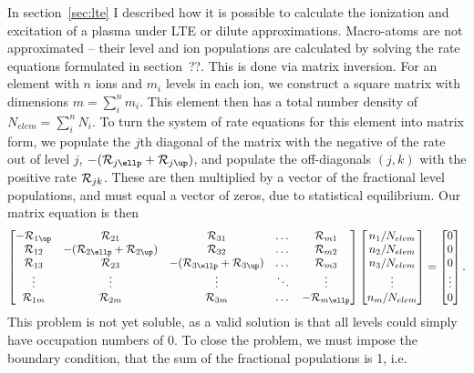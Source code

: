In section~\ref{sec:lte} I described how it is possible to calculate the
ionization and excitation of a plasma under LTE or dilute approximations.
Macro-atoms are not approximated -- their level and ion populations are 
calculated by solving the rate equations formulated in section~??. 
This is done via matrix inversion. For an element with $n$ ions and $m_i$
levels in each ion, we construct a square matrix with dimensions 
$m = \sum_i^n m_i$.
This element then has a total number density of $N_{elem} = \sum_i^n N_i$.
To turn the system of rate equations for this element into matrix form, we
populate the $j$th diagonal of the matrix with the negative of the rate out of
level $j$, $-({\cal R}_{j\ellp} + {\cal R}_{j\up})$, 
and populate the off-diagonals $(j,k)$ with the positive rate 
${\cal R}_{jk}$. These are then multiplied by a vector of the fractional level
populations, and must equal a vector of zeros, due to statistical equilibrium.
Our matrix equation is then
%
\begin{equation}
\begin{bmatrix}
    -{\cal R}_{1\up} & {\cal R}_{21} & {\cal R}_{31} & \dots & {\cal R}_{m1} \\
    {\cal R}_{12} & -({\cal R}_{2\ellp} + {\cal R}_{2\up}) & {\cal R}_{32} & \dots & {\cal R}_{m2} \\
    {\cal R}_{13}  & {\cal R}_{23} & -({\cal R}_{3\ellp} + {\cal R}_{3\up}) & \dots & {\cal R}_{m3} \\
    \vdots & \vdots & \vdots & \ddots & \vdots \\
    {\cal R}_{1m}      & {\cal R}_{2m} & {\cal R}_{3m} & \dots & -{\cal R}_{m\ellp}
\end{bmatrix}
\begin{bmatrix}
    n_1 / N_{elem} \\
    n_2 / N_{elem} \\
    n_3 / N_{elem} \\
    \vdots         \\
    n_m / N_{elem} 
\end{bmatrix}
=
\begin{bmatrix}
    0 \\
    0 \\
    0 \\
    \vdots \\
    0
\end{bmatrix}
.
\end{equation}
%
This problem is not yet soluble, as a valid solution is that all levels 
could simply have occupation numbers of $0$. To close the problem, we must impose the boundary condition, that the sum of the fractional populations is 1, i.e.
